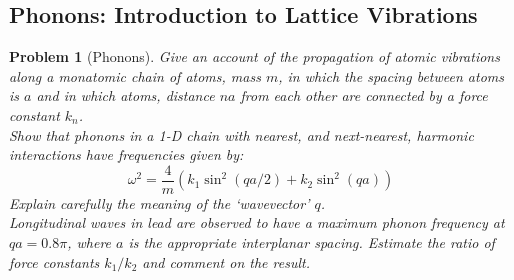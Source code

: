 \documentclass[a4paper]{article}
\theoremstyle{new}
\newtheorem{qns}{Problem}[section]
\begin{document}
\subsection*{Phonons: Introduction to Lattice Vibrations}
\begin{qns}[Phonons]
Give an account of the propagation of atomic vibrations along a monatomic chain of atoms, mass $m$, in which the spacing between atoms is $a$ and in which atoms, distance $na$ from each other are connected by a force constant $k_n$.\\[5pt]
Show that phonons in a 1-D chain with nearest, and next-nearest, harmonic interactions have frequencies given by:
$$\omega^2=\frac{4}{m}(k_1\sin^2(qa/2)+k_2\sin^2(qa))$$
Explain carefully the meaning of the ‘wavevector’ $q$.\\[5pt]
Longitudinal waves in lead are observed to have a maximum phonon frequency at $qa = 0.8\pi$, where $a$ is the appropriate interplanar spacing. Estimate the ratio of force constants $k_1/k_2$ and comment on the result.
\end{qns}
\end{document}
